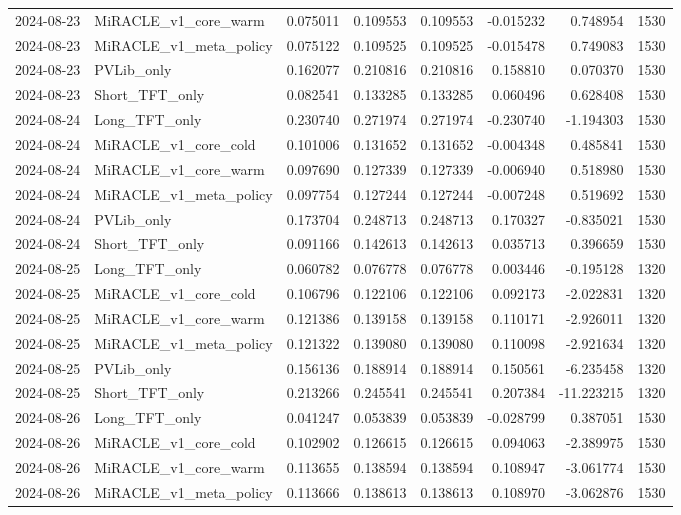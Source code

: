 \begin{tabular}{llrrrrrr}
2024-08-23 & MiRACLE_v1_core_warm & 0.075011 & 0.109553 & 0.109553 & -0.015232 & 0.748954 & 1530 \\
2024-08-23 & MiRACLE_v1_meta_policy & 0.075122 & 0.109525 & 0.109525 & -0.015478 & 0.749083 & 1530 \\
2024-08-23 & PVLib_only & 0.162077 & 0.210816 & 0.210816 & 0.158810 & 0.070370 & 1530 \\
2024-08-23 & Short_TFT_only & 0.082541 & 0.133285 & 0.133285 & 0.060496 & 0.628408 & 1530 \\
2024-08-24 & Long_TFT_only & 0.230740 & 0.271974 & 0.271974 & -0.230740 & -1.194303 & 1530 \\
2024-08-24 & MiRACLE_v1_core_cold & 0.101006 & 0.131652 & 0.131652 & -0.004348 & 0.485841 & 1530 \\
2024-08-24 & MiRACLE_v1_core_warm & 0.097690 & 0.127339 & 0.127339 & -0.006940 & 0.518980 & 1530 \\
2024-08-24 & MiRACLE_v1_meta_policy & 0.097754 & 0.127244 & 0.127244 & -0.007248 & 0.519692 & 1530 \\
2024-08-24 & PVLib_only & 0.173704 & 0.248713 & 0.248713 & 0.170327 & -0.835021 & 1530 \\
2024-08-24 & Short_TFT_only & 0.091166 & 0.142613 & 0.142613 & 0.035713 & 0.396659 & 1530 \\
2024-08-25 & Long_TFT_only & 0.060782 & 0.076778 & 0.076778 & 0.003446 & -0.195128 & 1320 \\
2024-08-25 & MiRACLE_v1_core_cold & 0.106796 & 0.122106 & 0.122106 & 0.092173 & -2.022831 & 1320 \\
2024-08-25 & MiRACLE_v1_core_warm & 0.121386 & 0.139158 & 0.139158 & 0.110171 & -2.926011 & 1320 \\
2024-08-25 & MiRACLE_v1_meta_policy & 0.121322 & 0.139080 & 0.139080 & 0.110098 & -2.921634 & 1320 \\
2024-08-25 & PVLib_only & 0.156136 & 0.188914 & 0.188914 & 0.150561 & -6.235458 & 1320 \\
2024-08-25 & Short_TFT_only & 0.213266 & 0.245541 & 0.245541 & 0.207384 & -11.223215 & 1320 \\
2024-08-26 & Long_TFT_only & 0.041247 & 0.053839 & 0.053839 & -0.028799 & 0.387051 & 1530 \\
2024-08-26 & MiRACLE_v1_core_cold & 0.102902 & 0.126615 & 0.126615 & 0.094063 & -2.389975 & 1530 \\
2024-08-26 & MiRACLE_v1_core_warm & 0.113655 & 0.138594 & 0.138594 & 0.108947 & -3.061774 & 1530 \\
2024-08-26 & MiRACLE_v1_meta_policy & 0.113666 & 0.138613 & 0.138613 & 0.108970 & -3.062876 & 1530 \\

\end{tabular}
